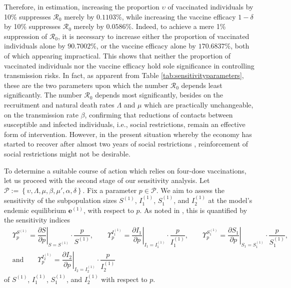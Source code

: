 \documentclass[11pt,reqno]{amsart}
\newcommand{\cR}{\mathcal{R}}
\begin{document}
Therefore, in estimation, increasing the proportion $\upsilon$ of vaccinated individuals by 10\% suppresses $\cR_0$ merely by $0.1103\%$, while increasing the vaccine efficacy $1-\delta $ by 10\% suppresses $\cR_0$ merely by $0.0586\%$. Indeed, to achieve a mere 1\% suppression of $\cR_0$, it is necessary to increase either the proportion of vaccinated individuals alone by $90.7002\%$, or the vaccine efficacy alone by $170.6837\%$, both of which appearing impractical. This shows that neither the proportion of vaccinated individuals nor the vaccine efficacy hold sole significance in controlling transmission risks. In fact, as apparent from Table \ref{tab:sensitivityparameters}, these are the two parameters upon which the number $\cR_0$ depends least significantly. The number $\cR_0$ depends most significantly, besides on the recruitment and natural death rates $\Lambda$ and $\mu$ which are practically unchangeable, on the transmission rate $\beta$, confirming that reductions of contacts between susceptible and infected individuals, i.e., social restrictions, remain an effective form of intervention. However, in the present situation whereby the economy has started to recover after almost two years of social restrictions \cite{SatyagrahaKenzu,SuroyoSulaiman,SwasonoSuhanda}, reinforcement of social restrictions might not be desirable.

To determine a suitable course of action which relies on four-dose vaccinations, let us proceed with the second stage of our sensitivity analysis. Let $\mathcal{P}:=\left\{\upsilon,\Lambda,\mu,\beta,\mu',\alpha,\delta\right\}$. Fix a parameter $p\in\mathcal{P}$. We aim to assess the sensitivity of the subpopulation sizes $S^{(1)}$, $I_1^{(1)}$, $S_1^{(1)}$, and $I_2^{(1)}$ at the model's endemic equilibrium $\mathbf{e}^{(1)}$, with respect to $p$. As noted in \cite[page 1294]{ChitnisHymanCushing}, this is quantified by the sensitivity indices
\begin{eqnarray*}
&\Upsilon^{S^{(1)}}_{p}=\left.\dfrac{\partial S}{\partial p}\right|_{S=S^{(1)}}\cdot\dfrac{p}{S^{(1)}},\qquad \Upsilon^{I_1^{(1)}}_{p}=\left.\dfrac{\partial I_1}{\partial p}\right|_{I_1=I_1^{(1)}}\cdot\dfrac{p}{I_1^{(1)}},\qquad \Upsilon^{S_1^{(1)}}_{p}=\left.\dfrac{\partial S_1}{\partial p}\right|_{S_1=S_1^{(1)}}\cdot\dfrac{p}{S_1^{(1)}},&\\
&\text{and}\qquad \Upsilon^{I_2^{(1)}}_{p}=\left.\dfrac{\partial I_2}{\partial p}\right|_{I_2=I_2^{(1)}}\cdot\dfrac{p}{I_2^{(1)}}&
\end{eqnarray*}
of $S^{(1)}$, $I_1^{(1)}$, $S_1^{(1)}$, and $I_2^{(1)}$ with respect to $p$.
\end{document}
